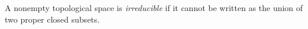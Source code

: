 
A nonempty topological space is \emph{irreducible} if it cannot be written as the union of two proper closed subsets.
